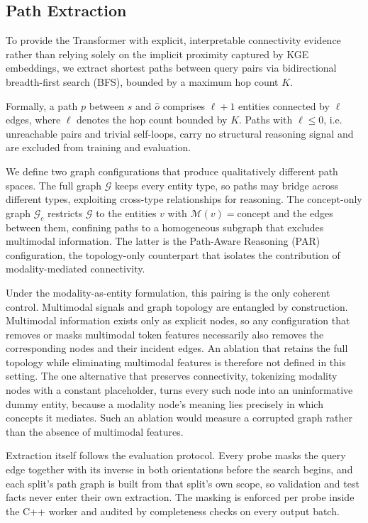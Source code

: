 \documentclass[runningheads]{llncs}
\begin{document}
\subsection{Path Extraction}
\label{sec:path-extraction}

To provide the Transformer with explicit, interpretable connectivity evidence rather than
relying solely on the implicit proximity captured by KGE embeddings, we extract shortest
paths between query pairs via bidirectional breadth-first search (BFS), bounded by a
maximum hop count $K$.

Formally, a path $p$ between $s$ and $\hat{o}$ comprises $\ell + 1$
entities connected by $\ell$ edges, where
$\ell$ denotes the hop count bounded by $K$.
Paths with $\ell \leq 0$, i.e. unreachable pairs and trivial self-loops,
carry no structural reasoning signal and are excluded from training and
evaluation.

We define two graph configurations that produce qualitatively different
path spaces. The full graph $\mathcal{G}$ keeps every entity type, so
paths may bridge across different types, exploiting cross-type
relationships for reasoning. The concept-only graph $\mathcal{G}_c$
restricts $\mathcal{G}$ to the entities $v$ with
$\mathcal{M}(v) = \text{concept}$ and the edges between them, confining
paths to a homogeneous subgraph that excludes multimodal information.
The latter is the Path-Aware Reasoning (PAR) configuration, the
topology-only counterpart that isolates the contribution of
modality-mediated connectivity.

Under the modality-as-entity formulation, this pairing is the only
coherent control. Multimodal signals and graph topology are entangled by
construction. Multimodal information exists only as explicit nodes, so
any configuration that removes or masks multimodal token features
necessarily also removes the corresponding nodes and their incident
edges. An ablation that retains the full topology while eliminating
multimodal features is therefore not defined in this setting. The one
alternative that preserves connectivity, tokenizing modality nodes with
a constant placeholder, turns every such node into an uninformative
dummy entity, because a modality node's meaning lies precisely in which
concepts it mediates. Such an ablation would measure a corrupted graph
rather than the absence of multimodal features.

Extraction itself follows the evaluation protocol. Every probe masks
the query edge together with its inverse in both orientations before
the search begins, and each split's path graph is built from that
split's own scope, so validation and test facts never enter their own
extraction. The masking is enforced per probe inside the C++ worker
and audited by completeness checks on every output batch.
\end{document}
